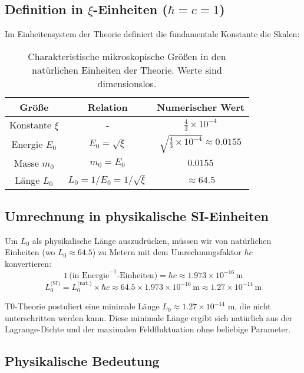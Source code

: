 \documentclass[12pt,a4paper]{article}
\numberwithin{equation}{section}
\begin{document}
	\subsection{Definition in $\xi$-Einheiten ($\hbar = c = 1$)}
	Im Einheitensystem der Theorie definiert die fundamentale Konstante die Skalen:
	
	\begin{table}[h!]
		\centering
		\begin{tabular}{ccc}
			\toprule
			\textbf{Größe} & \textbf{Relation} & \textbf{Numerischer Wert} \\
			\midrule
			Konstante $\xi$ & - & $\frac{4}{3} \times 10^{-4}$ \\
			Energie $E_0$ & $E_0 = \sqrt{\xi}$ & $\sqrt{\frac{4}{3} \times 10^{-4}} \approx 0.0155$ \\
			Masse $m_0$ & $m_0 = E_0$ & $0.0155$ \\
			Länge $L_0$ & $L_0 = 1/E_0 = 1/\sqrt{\xi}$ & $\approx 64.5$ \\
			\bottomrule
		\end{tabular}
		\caption{Charakteristische mikroskopische Größen in den natürlichen Einheiten der Theorie. Werte sind dimensionslos.}
	\end{table}
	
	\subsection{Umrechnung in physikalische SI-Einheiten}
	Um $L_0$ als physikalische Länge auszudrücken, müssen wir von natürlichen Einheiten (wo $L_0 \approx 64.5$) zu Metern mit dem Umrechnungsfaktor $\hbar c$ konvertieren:
	\[
	1 \, \text{(in Energie}^{-1}\text{-Einheiten)} = \hbar c \approx 1.973 \times 10^{-16}\,\text{m}
	\]
	\[
	L_0^{\text{(SI)}} = L_0^{\text{(nat.)}} \times \hbar c \approx 64.5 \times 1.973 \times 10^{-16}\,\text{m} \approx 1.27 \times 10^{-14}\,\text{m}
	\]
	
	\begin{wichtig}[]
		T0-Theorie postuliert eine minimale Länge $L_0 \approx 1.27 \times 10^{-14}$ m, die nicht unterschritten werden kann. Diese minimale Länge ergibt sich natürlich aus der Lagrange-Dichte und der maximalen Feldfluktuation ohne beliebige Parameter.
	\end{wichtig}
	
	\subsection{Physikalische Bedeutung}
	
\end{document}
